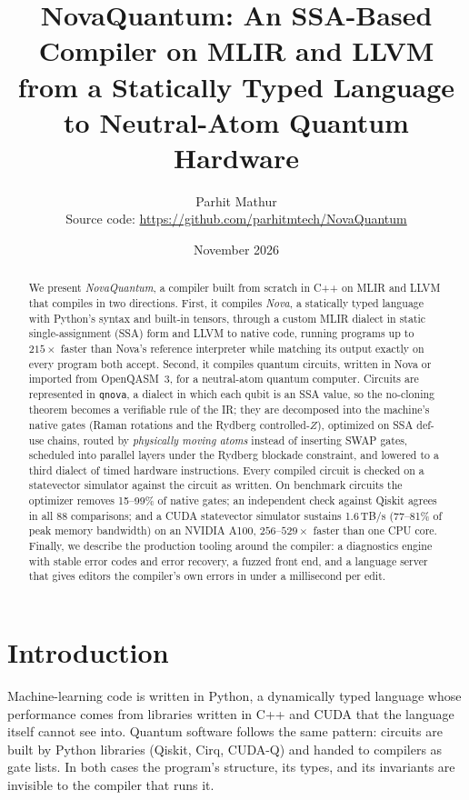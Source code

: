 \documentclass[11pt]{article}
\title{\textbf{NovaQuantum: An SSA-Based Compiler on MLIR and LLVM\\
from a Statically Typed Language to Neutral-Atom Quantum Hardware}}
\author{Parhit Mathur\\
\small Source code: \url{https://github.com/parhitmtech/NovaQuantum}}
\date{November 2026}
\begin{document}
\maketitle

\begin{abstract}
We present \emph{NovaQuantum}, a compiler built from scratch in C++ on MLIR and LLVM that compiles in two directions.
First, it compiles \emph{Nova}, a statically typed language with Python's syntax and built-in tensors, through a
custom MLIR dialect in static single-assignment (SSA) form and LLVM to native code, running programs up to
$215\times$ faster than Nova's reference interpreter while matching its output exactly on every program both
accept. Second, it compiles quantum circuits, written in Nova or imported from OpenQASM~3, for a neutral-atom
quantum computer. Circuits are represented in \texttt{qnova}, a dialect in which each qubit is an SSA value, so the
no-cloning theorem becomes a verifiable rule of the IR; they are decomposed into the machine's native gates
(Raman rotations and the Rydberg controlled-$Z$), optimized on SSA def-use chains, routed by \emph{physically moving
atoms} instead of inserting SWAP gates, scheduled into parallel layers under the Rydberg blockade constraint, and
lowered to a third dialect of timed hardware instructions. Every compiled circuit is checked on a statevector
simulator against the circuit as written. On benchmark circuits the optimizer removes 15--99\% of native gates; an
independent check against Qiskit agrees in all 88 comparisons; and a CUDA statevector simulator sustains 1.6\,TB/s
(77--81\% of peak memory bandwidth) on an NVIDIA A100, $256$--$529\times$ faster than one CPU core. Finally, we
describe the production tooling around the compiler: a diagnostics engine with stable error codes and error
recovery, a fuzzed front end, and a language server that gives editors the compiler's own errors in under a
millisecond per edit.
\end{abstract}

\section{Introduction}

Machine-learning code is written in Python, a dynamically typed language whose performance comes from libraries
written in C++ and CUDA that the language itself cannot see into. Quantum software follows the same pattern: circuits
are built by Python libraries (Qiskit, Cirq, CUDA-Q) and handed to compilers as gate lists. In both cases the
program's structure, its types, and its invariants are invisible to the compiler that runs it.
\end{document}
